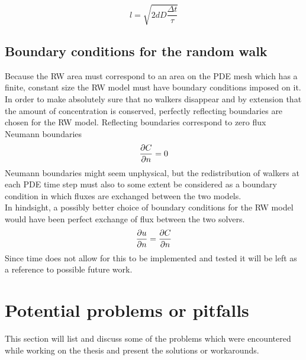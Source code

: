 \begin{equation}\label{theory:step_length}
 l = \sqrt{2dD\frac{\Delta t}{\tau}}
\end{equation}

\subsection{Boundary conditions for the random walk}

Because the RW area must correspond to an area on the PDE mesh which has a finite, constant size the RW model must have boundary conditions imposed on it. 
In order to make absolutely sure that no walkers disappear and by extension that the amount of concentration is conserved, perfectly reflecting boundaries are chosen for the RW model. 
Reflecting boundaries correspond to zero flux Neumann boundaries
\begin{equation}
 \frac{\partial C}{\partial n} = 0
\end{equation}
Neumann boundaries might seem unphysical, but the redistribution of walkers at each PDE time step must also to some extent be considered as a boundary condition in which fluxes are exchanged between the two models. \\
In hindsight, a possibly better choice of boundary conditions for the RW model would have been perfect exchange of flux between the two solvers. 
\begin{equation}
 \frac{\partial u}{\partial n} = \frac{\partial C}{\partial n}
\end{equation}
Since time does not allow for this to be implemented and tested it will be left as a reference to possible future work.

\section{Potential problems or pitfalls}\label{problems_and_pitfalls}
 
 This section will list and discuss some of the problems which were encountered while working on the thesis and present the solutions or workarounds.

% 


